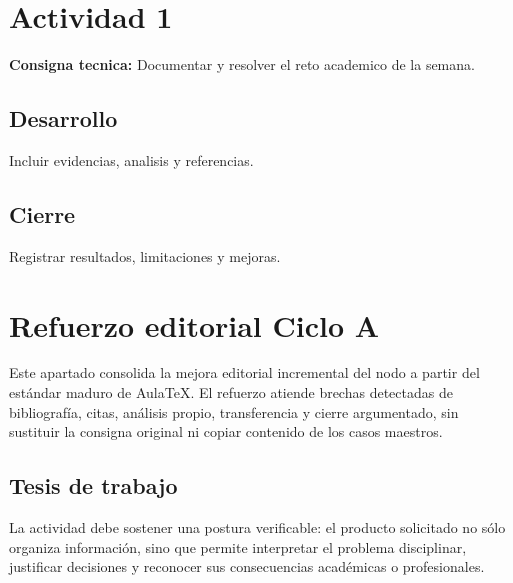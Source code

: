 \documentclass[spanish,letterpaper,oneside]{article}
\begin{document}
\templatePortrait
\templatePagecfg
\onehalfspacing

\section{Actividad 1}
\textbf{Consigna tecnica:} Documentar y resolver el reto academico de la semana.

\subsection{Desarrollo}
Incluir evidencias, analisis y referencias.

\subsection{Cierre}
Registrar resultados, limitaciones y mejoras.



\section*{Refuerzo editorial Ciclo A}
Este apartado consolida la mejora editorial incremental del nodo a partir del estándar maduro de AulaTeX. El refuerzo atiende brechas detectadas de bibliografía, citas, análisis propio, transferencia y cierre argumentado, sin sustituir la consigna original ni copiar contenido de los casos maestros.

\subsection*{Tesis de trabajo}
La actividad debe sostener una postura verificable: el producto solicitado no sólo organiza información, sino que permite interpretar el problema disciplinar, justificar decisiones y reconocer sus consecuencias académicas o profesionales.
\end{document}
